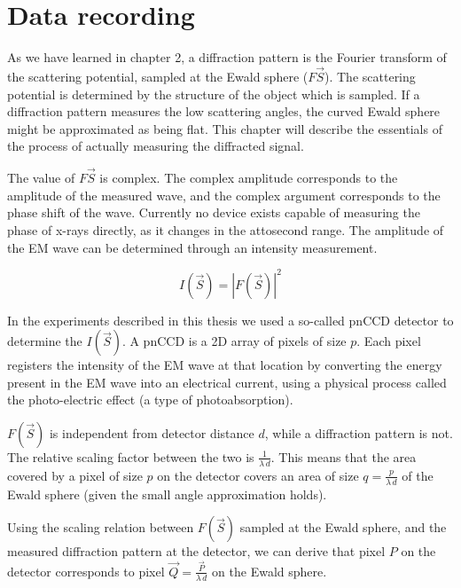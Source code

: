 \chapter{Data recording}
As we have learned in chapter 2, a diffraction pattern is the Fourier transform of the scattering potential, sampled at the Ewald sphere ($F{\vec{S}}$). The scattering potential is determined by the structure of the object which is sampled. If a diffraction pattern measures the low scattering angles, the curved Ewald sphere might be approximated as being flat. This chapter will describe the essentials of the process of actually measuring the diffracted signal.

The value of $F{\vec{S}}$ is complex. The complex amplitude corresponds to the amplitude of the measured wave, and the complex argument corresponds to the phase shift of the wave.
Currently no device exists capable of measuring the phase of x-rays directly, as it changes in the attosecond range. The amplitude of the EM wave can be determined through an intensity measurement. 

\begin{equation}
I(\vec{S}) = |F(\vec{S})|^2
\end{equation}

In the experiments described in this thesis we used a so-called pnCCD detector to determine the $I(\vec{S})$. A pnCCD is a 2D array of pixels of size $p$. Each pixel registers the intensity of the EM wave at that location by converting the energy present in the EM wave into an electrical current, using a physical process called the photo-electric effect (a type of photoabsorption). 

$F(\vec{S})$ is independent from detector distance $d$, while a diffraction pattern is not. The relative scaling factor between the two is $\frac{1}{\lambda\,d}$. This means that the area covered by a pixel of size $p$ on the detector covers an area of size $q = \frac{p}{\lambda \, d}$ of the Ewald sphere (given the small angle approximation holds). 


Using the scaling relation between $F(\vec{S})$ sampled at the Ewald sphere, and the measured diffraction pattern at the detector, we can derive that pixel $P$ on the detector corresponds to pixel $\vec{Q} = \frac{\vec{P}}{\lambda\,d}$ on the Ewald sphere. 

